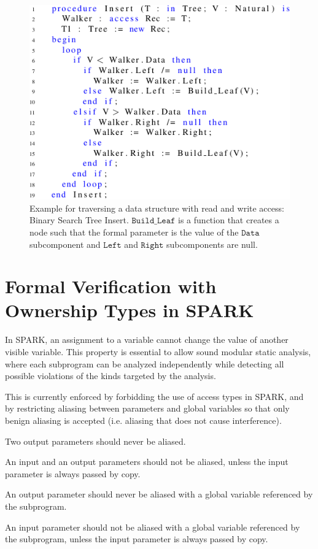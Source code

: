 \documentclass{llncs}
\newcommand\var[1]{\ensuremath{\mathtt{#1}}}
\begin{document}
\begin{figure}[htb!]
\centering
  \captionsetup{justification=centering,margin=0.6cm}
   \includegraphics[]{treeInsert}
   \caption{Example for traversing a data structure with read and write access: Binary Search Tree Insert. \var{Build\_Leaf} is a function that creates a node such that the formal
	parameter is the value of the \var{Data} subcomponent and \var{Left} and \var{Right} subcomponents are null.}
   \label{fig:treeInsert}
\end{figure}


\section{Formal Verification with Ownership Types in SPARK}

In SPARK, an assignment to a variable cannot change the value of another visible variable. This property is essential to allow sound modular static analysis,
where each subprogram can be analyzed independently while detecting all possible violations of the kinds targeted by the analysis.

This is currently enforced by forbidding the use of access types in SPARK, and by restricting aliasing between parameters and global variables so that only
benign aliasing is accepted (i.e. aliasing that does not cause interference).


\begin{compactitem}
  \item Two output parameters should never be aliased.
  \item An input and an output parameters should not be aliased, unless the input parameter is always passed by copy.
  \item An output parameter should never be aliased with a global variable referenced by the subprogram.
  \item An input parameter should not be aliased with a global variable referenced by the subprogram, unless the input parameter is always passed by copy.
\end{compactitem}
\end{document}
